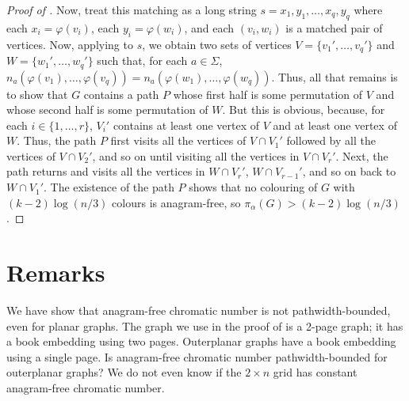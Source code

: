 \documentclass{patmorin}
\begin{document}
\begin{proof}[Proof of ]
Now, treat this matching as a long string $s=x_1,y_1,\ldots,x_q,y_q$
where each $x_i=\varphi(v_i)$, each $y_i=\varphi(w_i)$, and each
$(v_i,w_i)$ is a matched pair of vertices.  Now, applying
 to $s$, we obtain two sets of vertices
$V=\{v_1',\ldots,v_q'\}$ and $W=\{w_1',\ldots,w_q'\}$ such that, 
for each $a\in\Sigma$,
$n_a(\varphi(v_1),\ldots,\varphi(v_q))=n_a(\varphi(w_1),\ldots,\varphi(w_q))$.
Thus, all that remains is to show that $G$ contains a path $P$ whose first
half is some permutation of $V$ and whose second half
is some permutation of $W$.  But this is obvious, because,
for each $i\in\{1,\ldots,r\}$, $V_i'$ contains at least one vertex of $V$
and at least one vertex of $W$.  Thus, the path $P$ first visits all the
vertices of $V\cap V_1'$ followed by all the vertices of $V\cap V_2'$,
and so on until visiting all the vertices in $V\cap V_r'$. Next, the path
returns and visits all the vertices in $W\cap V_r'$, $W\cap V_{r-1}'$,
and so on back to $W\cap V_1'$.  The existence of the path $P$ shows
that no colouring of $G$ with $(k-2)\log(n/3)$ colours is anagram-free, so $\pi_\alpha(G) > (k-2)\log(n/3)$.
\end{proof}

\section{Remarks}

We have show that anagram-free chromatic number is not pathwidth-bounded,
even for planar graphs.  The graph we use in the proof of 
is a 2-page graph; it has a book embedding using two pages.  Outerplanar
graphs have a book embedding using a single page.  Is anagram-free
chromatic number pathwidth-bounded for outerplanar graphs?  We do not even know if the $2\times n$ grid has constant anagram-free chromatic number.




\end{document}
